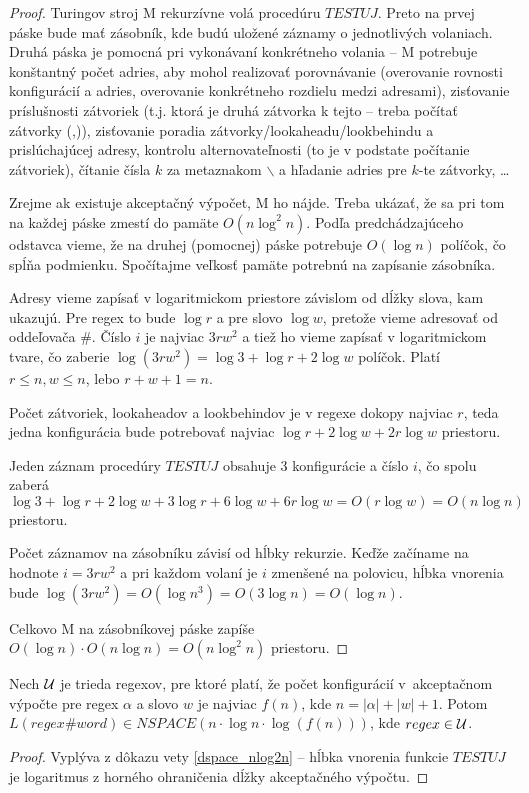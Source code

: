 \begin{proof}
Turingov stroj M rekurzívne volá procedúru $TESTUJ$. Preto na prvej páske bude mať zásobník, kde budú uložené záznamy o jednotlivých volaniach. Druhá páska je pomocná pri vykonávaní konkrétneho volania -- M potrebuje konštantný počet adries, aby mohol realizovať porovnávanie (overovanie rovnosti konfigurácií a adries, overovanie konkrétneho rozdielu medzi adresami), zisťovanie príslušnosti zátvoriek (t.j. ktorá je druhá zátvorka k tejto -- treba počítať zátvorky (,)), zisťovanie poradia zátvorky/lookaheadu/lookbehindu a prislúchajúcej adresy, kontrolu alternovateľnosti (to je v podstate počítanie zátvoriek), čítanie čísla $k$ za metaznakom $\backslash$ a hľadanie adries pre $k$-te zátvorky, \dots

Zrejme ak existuje akceptačný výpočet, M ho nájde. Treba ukázať, že sa pri tom na každej páske zmestí do pamäte $O(n\log^2 n)$. Podľa predchádzajúceho odstavca vieme, že na druhej (pomocnej) páske potrebuje $O(\log n)$ políčok, čo spĺňa podmienku. Spočítajme veľkosť pamäte potrebnú na zapísanie zásobníka.

Adresy vieme zapísať v logaritmickom priestore závislom od dĺžky slova, kam ukazujú. Pre regex to bude $\log r$ a pre slovo $\log w$, pretože vieme adresovať od oddeľovača \#. Číslo $i$ je najviac $3rw^2$ a tiež ho vieme zapísať v logaritmickom tvare, čo zaberie $\log (3rw^2) = \log 3 + \log r + 2\log w$ políčok. Platí $r\leq n, w\leq n$, lebo $r+w+1=n$.

Počet zátvoriek, lookaheadov a lookbehindov je v regexe dokopy najviac $r$, teda jedna konfigurácia bude potrebovať najviac $\log r + 2\log w + 2r\log w$ priestoru.

Jeden záznam procedúry $TESTUJ$ obsahuje 3 konfigurácie a číslo $i$, čo spolu zaberá $\log 3+\log r + 2\log w + 3\log r + 6\log w + 6r\log w = O(r\log w) = O(n\log n)$ priestoru.

Počet záznamov na zásobníku závisí od hĺbky rekurzie. Keďže začíname na hodnote $i=3rw^2$ a pri každom volaní je $i$ zmenšené na polovicu, hĺbka vnorenia bude $\log(3rw^2)=O(\log n^3) = O(3\log n) = O(\log n)$.

Celkovo M na zásobníkovej páske zapíše $O(\log n)\cdot O(n\log n) = O(n\log^2 n)$ priestoru.
\end{proof}

\begin{dosledok}
Nech $\cal U$ je trieda regexov, pre ktoré platí, že počet konfigurácií v~akceptačnom výpočte pre regex $\alpha$ a slovo $w$ je najviac $f(n)$, kde $n=|\alpha|+|w|+1$. Potom $L(regex\#word)\in NSPACE(n\cdot\log n\cdot \log (f(n)))$, kde $regex \in \cal U$.
\end{dosledok}
\begin{proof}
Vyplýva z dôkazu vety \ref{dspace_nlog2n} -- hĺbka vnorenia funkcie $TESTUJ$ je logaritmus z horného ohraničenia dĺžky akceptačného výpočtu.
\end{proof}

